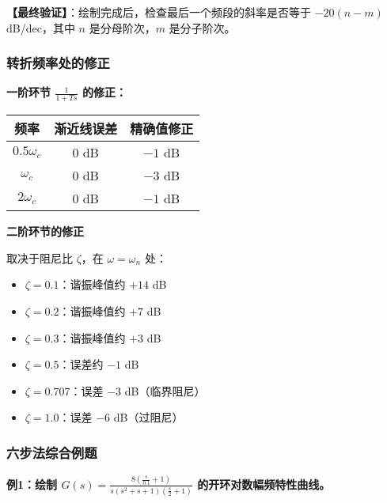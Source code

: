 \textbf{【最终验证】}：绘制完成后，检查最后一个频段的斜率是否等于 $-20(n-m)$ dB/dec，其中 $n$ 是分母阶次，$m$ 是分子阶次。

\subsubsection{转折频率处的修正}

\textbf{一阶环节 $\frac{1}{1+Ts}$ 的修正：}

\begin{center}
\begin{tabular}{c|c|c}
\hline
频率 & 渐近线误差 & 精确值修正 \\
\hline
$0.5\omega_c$ & $0$ dB & $-1$ dB \\
$\omega_c$ & $0$ dB & $-3$ dB \\
$2\omega_c$ & $0$ dB & $-1$ dB \\
\hline
\end{tabular}
\end{center}

\textbf{二阶环节的修正}

取决于阻尼比 $\zeta$，在 $\omega = \omega_n$ 处：
\begin{itemize}
    \item $\zeta = 0.1$：谐振峰值约 $+14$ dB
    \item $\zeta = 0.2$：谐振峰值约 $+7$ dB
    \item $\zeta = 0.3$：谐振峰值约 $+3$ dB
    \item $\zeta = 0.5$：误差约 $-1$ dB
    \item $\zeta = 0.707$：误差 $-3$ dB（临界阻尼）
    \item $\zeta = 1.0$：误差 $-6$ dB（过阻尼）
\end{itemize}

\subsubsection{六步法综合例题}

\textbf{例1：绘制 $G(s) = \frac{8(\frac{s}{0.1}+1)}{s(s^2+s+1)(\frac{s}{2}+1)}$ 的开环对数幅频特性曲线。}

